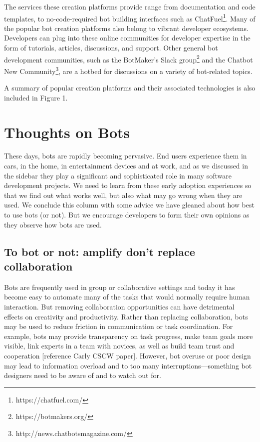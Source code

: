 \documentclass{sig-alternate}
\begin{document}
	The services these creation platforms provide range from documentation and code templates, to no-code-required bot building interfaces such as ChatFuel\footnote{https://chatfuel.com/}. 
	Many of the popular bot creation platforms also belong to vibrant developer ecosystems. Developers can plug into these online communities for developer expertise in the form of tutorials, articles, discussions, and support.  Other general bot development communities, such as the BotMaker's Slack group\footnote{https://botmakers.org/} and the Chatbot New Community\footnote{http://news.chatbotsmagazine.com/}, are a hotbed for discussions on a variety of bot-related topics.

	A summary of popular creation platforms and their associated technologies is also included in Figure 1.


 \section{Thoughts on Bots}
	

	These days, bots are rapidly becoming pervasive.  End users experience them in cars, in the home, in entertainment devices and at work, and as we discussed in the sidebar they play a significant and sophisticated role in many software development projects.  
	We need to learn from these early adoption experiences so that we find out what works well, but also what may go wrong when they are used.  We conclude this column with some advice we have gleaned about how best to use bots (or not).   
	But we encourage developers to form their own opinions as they observe how bots are used. 
	
	
	\subsection{To bot or not: amplify don't replace collaboration}
		Bots are frequently used in group or collaborative settings and 
		today it has become easy to automate many of the tasks that would normally require human interaction. But removing collaboration opportunities can have detrimental effects on creativity and productivity. 
		Rather than replacing collaboration, bots may be used to reduce friction in communication or task coordination. For example, bots may provide transparency  on task progress, make team goals more visible, link experts in a team with novices, as well as build team trust and cooperation [reference Carly CSCW paper].
		However, bot overuse or poor design may lead to information overload and to too many interruptions---something bot designers need to be aware of and to watch out for.  
\end{document}
